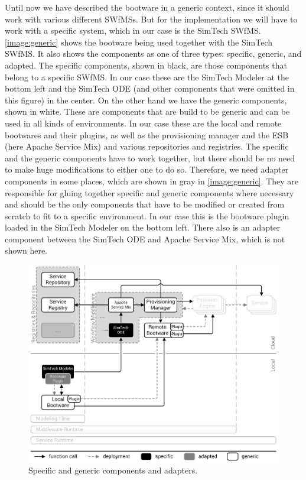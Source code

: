 Until now we have described the bootware in a generic context, since it should work with various different SWfMSs.
But for the implementation we will have to work with a specific system, which in our case is the SimTech SWfMS.
\autoref{image:generic} shows the bootware being used together with the SimTech SWfMS.
It also shows the components as one of three types: specific, generic, and adapted.
The specific components, shown in black, are those components that belong to a specific SWfMS.
In our case these are the SimTech Modeler at the bottom left and the SimTech ODE (and other components that were omitted in this figure) in the center.
On the other hand we have the generic components, shown in white.
These are components that are build to be generic and can be used in all kinds of environments.
In our case these are the local and remote bootwares and their plugins, as well as the provisioning manager and the ESB (here Apache Service Mix) and various repositories and registries.
The specific and the generic components have to work together, but there should be no need to make huge modifications to either one to do so.
Therefore, we need adapter components in some places, which are shown in gray in \autoref{image:generic}.
They are responsible for gluing together specific and generic components where necessary and should be the only components that have to be modified or created from scratch to fit to a specific environment.
In our case this is the bootware plugin loaded in the SimTech Modeler on the bottom left.
There also is an adapter component between the SimTech ODE and Apache Service Mix, which is not shown here.

\begin{figure}[!htbp]
	\centering
	\includegraphics[resolution=600]{implementation/assets/generic}
	\caption{Specific and generic components and adapters.}
	\label{image:generic}
\end{figure}

